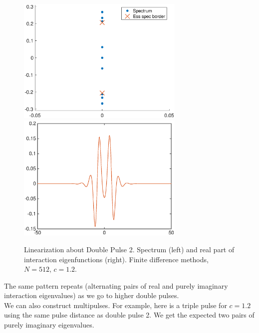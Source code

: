 \documentclass[12pt]{article}
\begin{document}
\begin{figure}[H]
\centering
\includegraphics[width=8cm]{spec12_double2.eps}
\includegraphics[width=8cm]{evecs12_double2real.eps}
\caption{Linearization about Double Pulse 2. Spectrum (left) and real part of interaction eigenfunctions (right). Finite difference methods, $N = 512$, $c = 1.2$.}
\end{figure}

The same pattern repeats (alternating pairs of real and purely imaginary interaction eigenvalues) as we go to higher double pulses.\\

We can also construct multipulses. For example, here is a triple pulse for $c = 1.2$ using the same pulse distance as double pulse 2. We get the expected two pairs of purely imaginary eigenvalues.
\end{document}
